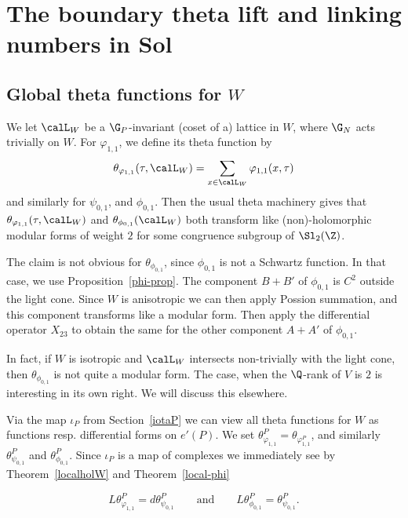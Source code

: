 

\section{The boundary theta lift and linking numbers in Sol}

\subsection{Global theta functions for $W$}

We let $\calL_W$ be a $\G_P$-invariant (coset of a) lattice in $W$,
where $\G_N$ acts trivially on $W$. For $\varphi_{1,1}$, we define
its theta function by
\[
\theta_{\varphi_{1,1}}(\tau,{\calL_W})= \sum_{x \in \calL_W} \varphi_{1,1}(x,\tau)
\]
and similarly for $\psi_{0,1}$, and $\phi_{0,1}$. Then the usual
theta machinery gives that
$\theta_{\varphi_{1,1}}(\tau,{\calL_W})$ and $\theta_{\phi_{0,1}}(\calL_W)$
both transform like (non)-holomorphic modular forms of weight $2$
for some congruence subgroup of $\Sl_2(\Z)$.

\begin{remark}
The claim is not obvious for $\theta_{\phi_{0,1}}$, since $\phi_{0,1}$
is not a Schwartz function. In that case, we use
Proposition~\ref{phi-prop}. The component $B+B'$ of $\phi_{0,1}$
is $C^2$ outside the light cone. Since $W$ is anisotropic we can
then apply Possion summation, and this component transforms like a
modular form. Then apply the differential operator $X_{23}$ to
obtain the same for the other component $A+A'$ of $\phi_{0,1}$.
 
 In fact, if $W$ is isotropic and $\calL_W$ intersects non-trivially
 with the light cone, then $\theta_{\phi_{0,1}}$ is not quite a
 modular form. The case, when the $\Q$-rank of $V$ is $2$ is
 interesting in its own right. We will discuss this elsewhere.
\end{remark}






Via the map $\iota_P$ from Section~\ref{iotaP} we can view all theta
functions for $W$ as functions resp. differential forms on $e'(P)$.
We set $
\theta^P_{\varphi_{1,1}} =   \theta_{\varphi_{1,1}^P}$, 
and similarly $\theta^P_{\psi_{0,1}}$ and $\theta^P_{\phi_{0,1}}$.
Since $\iota_P$ is a map of complexes we immediately see by
Theorem~\ref{localholW} and Theorem~\ref{local-phi}

\begin{proposition}\label{globalholomorphic2}
\[
L \theta^P_{\varphi_{1,1}} = d\theta^P_{\psi_{0,1}} \qquad \text{and} \qquad 
L \theta^P_{\phi_{0,1}} = \theta^P_{\psi_{0,1}}.
\]
\end{proposition}

